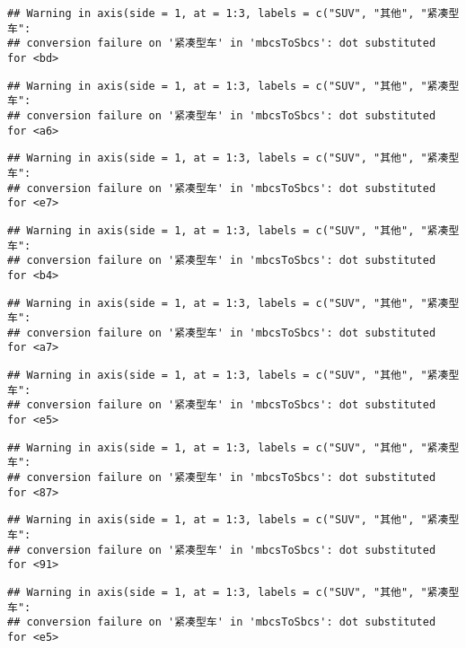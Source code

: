 \documentclass[]{article}
\begin{document}
\begin{verbatim}
## Warning in axis(side = 1, at = 1:3, labels = c("SUV", "其他", "紧凑型车":
## conversion failure on '紧凑型车' in 'mbcsToSbcs': dot substituted for <bd>
\end{verbatim}

\begin{verbatim}
## Warning in axis(side = 1, at = 1:3, labels = c("SUV", "其他", "紧凑型车":
## conversion failure on '紧凑型车' in 'mbcsToSbcs': dot substituted for <a6>
\end{verbatim}

\begin{verbatim}
## Warning in axis(side = 1, at = 1:3, labels = c("SUV", "其他", "紧凑型车":
## conversion failure on '紧凑型车' in 'mbcsToSbcs': dot substituted for <e7>
\end{verbatim}

\begin{verbatim}
## Warning in axis(side = 1, at = 1:3, labels = c("SUV", "其他", "紧凑型车":
## conversion failure on '紧凑型车' in 'mbcsToSbcs': dot substituted for <b4>
\end{verbatim}

\begin{verbatim}
## Warning in axis(side = 1, at = 1:3, labels = c("SUV", "其他", "紧凑型车":
## conversion failure on '紧凑型车' in 'mbcsToSbcs': dot substituted for <a7>
\end{verbatim}

\begin{verbatim}
## Warning in axis(side = 1, at = 1:3, labels = c("SUV", "其他", "紧凑型车":
## conversion failure on '紧凑型车' in 'mbcsToSbcs': dot substituted for <e5>
\end{verbatim}

\begin{verbatim}
## Warning in axis(side = 1, at = 1:3, labels = c("SUV", "其他", "紧凑型车":
## conversion failure on '紧凑型车' in 'mbcsToSbcs': dot substituted for <87>
\end{verbatim}

\begin{verbatim}
## Warning in axis(side = 1, at = 1:3, labels = c("SUV", "其他", "紧凑型车":
## conversion failure on '紧凑型车' in 'mbcsToSbcs': dot substituted for <91>
\end{verbatim}

\begin{verbatim}
## Warning in axis(side = 1, at = 1:3, labels = c("SUV", "其他", "紧凑型车":
## conversion failure on '紧凑型车' in 'mbcsToSbcs': dot substituted for <e5>
\end{verbatim}
\end{document}
